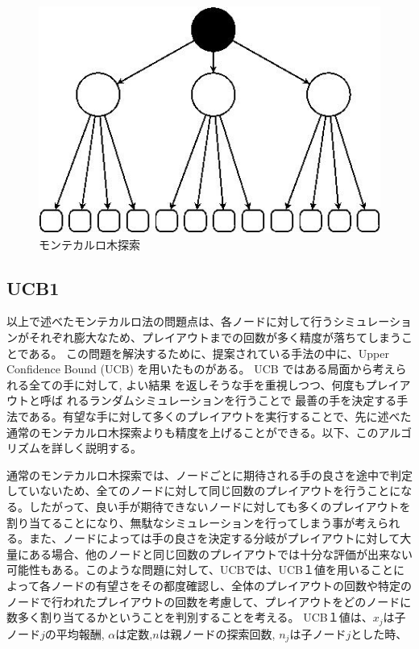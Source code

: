 \begin{figure}
 \centering
 \includegraphics[keepaspectratio, scale=0.5,bb=0 0 283 121]
      {img/monte.jpg}
 \caption{モンテカルロ木探索}
 \label{monte2}
\end{figure}

\subsection{UCB1}
以上で述べたモンテカルロ法の問題点は、各ノードに対して行うシミュレーションがそれぞれ膨大なため、プレイアウトまでの回数が多く精度が落ちてしまうことである。
この問題を解決するために、提案されている手法の中に、Upper Confidence Bound (UCB) \cite{UCB}を用いたものがある。
UCB ではある局面から考えられる全ての手に対して, よい結果 を返しそうな手を重視しつつ、何度もプレイアウトと呼ば れるランダムシミュレーションを行うことで 最善の手を決定する手法である。有望な手に対して多くのプレイアウトを実行することで、先に述べた通常のモンテカルロ木探索よりも精度を上げることができる。以下、このアルゴリズムを詳しく説明する。

通常のモンテカルロ木探索では、ノードごとに期待される手の良さを途中で判定していないため、全てのノードに対して同じ回数のプレイアウトを行うことになる。したがって、良い手が期待できないノードに対しても多くのプレイアウトを割り当てることになり、無駄なシミュレーションを行ってしまう事が考えられる。また、ノードによっては手の良さを決定する分岐がプレイアウトに対して大量にある場合、他のノードと同じ回数のプレイアウトでは十分な評価が出来ない可能性もある。このような問題に対して、UCBでは、UCB１値を用いることによって各ノードの有望さをその都度確認し、全体のプレイアウトの回数や特定のノードで行われたプレイアウトの回数を考慮して、プレイアウトをどのノードに数多く割り当てるかということを判別することを考える。
UCB１値は、${x_{j}}$は子ノード$j$の平均報酬, $α$は定数,$n$は親ノードの探索回数, ${n_{j}}$は子ノード$j$とした時、

